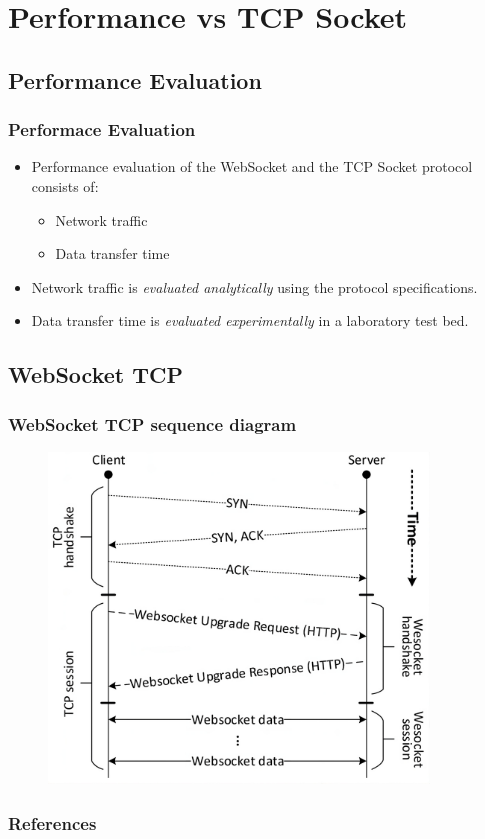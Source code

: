 \documentclass{beamer}
\begin{document}
\section{Performance vs TCP Socket}
\subsection{Performance Evaluation}
\begin{frame}
    \frametitle{Performace Evaluation}
    \begin{itemize}[<+->]
        \item Performance evaluation of the WebSocket and the TCP Socket protocol consists
              of:
              \begin{itemize}[<+->]
                  \item Network traffic
                  \item Data transfer time
              \end{itemize}
        \item Network traffic is \textit{evaluated analytically} using the protocol
              specifications.
        \item Data transfer time is \textit{evaluated experimentally} in a laboratory test
              bed.
    \end{itemize}
\end{frame}

\subsection{WebSocket TCP}
\begin{frame}
    \frametitle{WebSocket TCP sequence diagram}
    \begin{figure}
        \includegraphics[width=0.9\textwidth]{images/websocket_seq_diagram.jpeg}
    \end{figure}
\end{frame}

\begin{frame}
    \nocite{*}
    \frametitle{References}
    
    
\end{frame}
\end{document}
